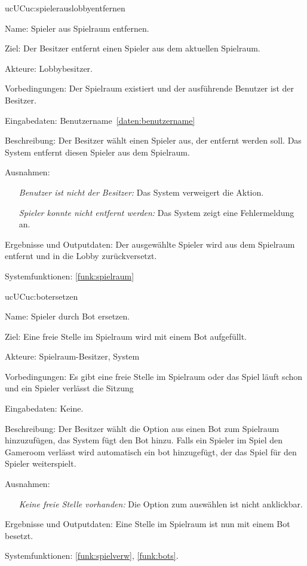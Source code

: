 \begin{description}[leftmargin=5em, style=sameline]
    \begin{lhp}{uc}{UC}{uc:spielerauslobbyentfernen}
    \item [Name:] Spieler aus Spielraum entfernen.
    \item [Ziel:] Der Besitzer entfernt einen Spieler aus dem aktuellen Spielraum.
    \item [Akteure:] Lobbybesitzer.
    \item [Vorbedingungen:] Der Spielraum existiert und der ausführende Benutzer ist der Besitzer.
    \item [Eingabedaten:] Benutzername~\ref{daten:benutzername}
    \item [Beschreibung:] Der Besitzer wählt einen Spieler aus, der entfernt werden soll. Das System entfernt diesen Spieler aus dem Spielraum.
    \item [Ausnahmen:] \hfill
        \begin{itemize}
            \item[] \textit{Benutzer ist nicht der Besitzer:} Das System verweigert die Aktion.
            \item[] \textit{Spieler konnte nicht entfernt werden:} Das System zeigt eine Fehlermeldung an.
        \end{itemize}
    \item [Ergebnisse und Outputdaten:] Der ausgewählte Spieler wird aus dem Spielraum entfernt und in die Lobby zurückversetzt.
    \item [Systemfunktionen:] \ref{funk:spielraum}
    \end{lhp}

    \begin{lhp}{uc}{UC}{uc:botersetzen}
    \item [Name:] Spieler durch Bot ersetzen.
    \item [Ziel:] Eine freie Stelle im Spielraum wird mit einem Bot aufgefüllt.
    \item [Akteure:] Spielraum-Besitzer, System
    \item [Vorbedingungen:] Es gibt eine freie Stelle im Spielraum oder das Spiel läuft schon und ein Spieler verlässt die Sitzung
    \item [Eingabedaten:] Keine.
    \item [Beschreibung:] Der Besitzer wählt die Option aus einen Bot zum Spielraum hinzuzufügen, das System fügt den Bot hinzu. Falls ein Spieler im Spiel den Gameroom verlässt wird automatisch ein bot hinzugefügt, der das Spiel für den Spieler weiterspielt.
    \item [Ausnahmen:] \hfill
        \begin{itemize}
            \item[] \textit{Keine freie Stelle vorhanden:} Die Option zum auswählen ist nicht anklickbar.
        \end{itemize}
    \item [Ergebnisse und Outputdaten:] Eine Stelle im Spielraum ist nun mit einem Bot besetzt.
    \item [Systemfunktionen:] \ref{funk:spielverw}, \ref{funk:bots}.
    \end{lhp}


\end{description}
